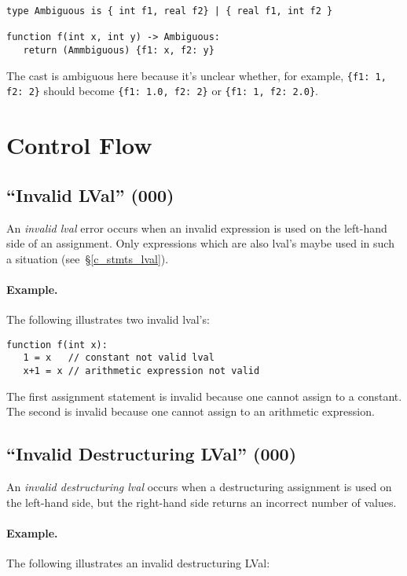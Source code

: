 \begin{lstlisting}
type Ambiguous is { int f1, real f2} | { real f1, int f2 }

function f(int x, int y) -> Ambiguous:
   return (Ammbiguous) {f1: x, f2: y}
\end{lstlisting}

The cast is ambiguous here because it's unclear whether, for example, \lstinline|{f1: 1, f2: 2}| should become \lstinline|{f1: 1.0, f2: 2}| or \lstinline|{f1: 1, f2: 2.0}|.

\section{Control Flow}

\subsection{``Invalid LVal'' (000)}

An {\em invalid lval} error occurs when an invalid expression is used on the left-hand side of an assignment.  Only expressions which are also lval's maybe used in such a situation  (see~\S\ref{c_stmts_lval}).

\paragraph{Example.}  The following illustrates two invalid lval's:

\begin{lstlisting}
function f(int x):
   1 = x   // constant not valid lval
   x+1 = x // arithmetic expression not valid    
\end{lstlisting}

The first assignment statement is invalid because one cannot assign to a constant.  The second is invalid because one cannot assign to an arithmetic expression.

\subsection{``Invalid Destructuring LVal'' (000)}

An {\em invalid destructuring lval} occurs when a destructuring assignment is used on the left-hand side, but the right-hand side returns an incorrect number of values.

\paragraph{Example.}  The following illustrates an invalid destructuring LVal:


